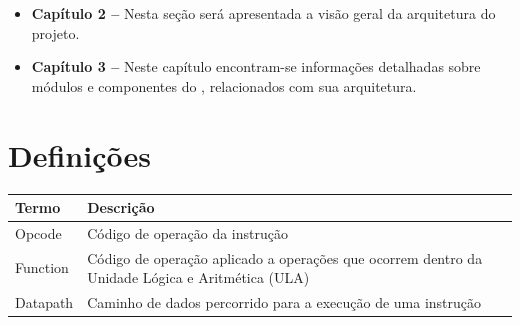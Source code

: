 \documentclass{report}
\begin{document}
  \begin{itemize}
  	\item \textbf{Capítulo 2 --} Nesta seção será apresentada a visão geral da arquitetura do projeto.
  	\item \textbf{Capítulo 3 --} Neste capítulo encontram-se informações detalhadas sobre módulos e componentes do \ipPROCESSProject, relacionados com sua arquitetura.
  \end{itemize}


  \section{Definições}
    \FloatBarrier
    \begin{table}[H]
      \begin{center}
        \begin{tabular}[pos]{|m{5cm} | m{9cm}|} 
          \hline
          \cellcolor[gray]{0.9}\textbf{Termo} & \cellcolor[gray]{0.9}\textbf{Descrição} \\ \hline
           Opcode   & Código de operação da instrução \\ \hline
           Function & Código de operação aplicado a operações que ocorrem dentro da Unidade Lógica e Aritmética (ULA)  \\ \hline
           Datapath & Caminho de dados percorrido para a execução de uma instrução \\ \hline
        \end{tabular}
      \end{center}
    \end{table}  

\end{document}
